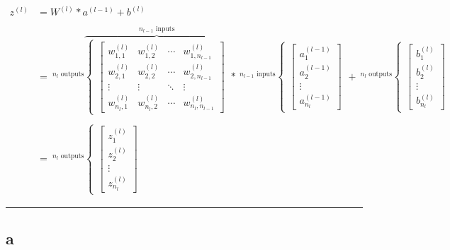 \documentclass[
]{book}
\begin{document}
\[
\begin{aligned}
z^{(l)} &= W^{(l)} * a^{(l - 1)} + b^{(l)} \\ \\
&= \ ^{n_l\text{ outputs}}
\overbrace{
  \begin{cases}
    \begin{bmatrix}
    w^{(l)}_{1, 1} & w^{(l)}_{1, 2} & \cdots & w^{(l)}_{1, n_{l-1}} \\
    w^{(l)}_{2, 1} & w^{(l)}_{2, 2} & \cdots & w^{(l)}_{2, n_{l-1}} \\
    \vdots & \vdots & \ddots & \vdots \\
    w^{(l)}_{n_l, 1} & w^{(l)}_{n_l, 2} & \cdots & w^{(l)}_{n_l, n_{l-1}}
    \end{bmatrix}
  \end{cases} 
}^{n_{l - 1} \text{ inputs}} * \ ^{n_{l - 1} \text{ inputs}}
  \begin{cases}
    \begin{bmatrix}
      a^{(l-1)}_{1} \\
      a^{(l-1)}_{2} \\
      \vdots \\
      a^{(l-1)}_{n_l}
    \end{bmatrix}
  \end{cases} + \ ^{n_l\text{ outputs}}
  \begin{cases}
    \begin{bmatrix}
    b^{(l)}_{1} \\
    b^{(l)}_{2} \\
    \vdots \\
    b^{(l)}_{n_l}
    \end{bmatrix}
  \end{cases} \\ \\
&= \ ^{n_l\text{ outputs}}
  \begin{cases}
    \begin{bmatrix}
      z^{(l)}_{1} \\
      z^{(l)}_{2} \\
      \vdots \\
      z^{(l)}_{n_l}
    \end{bmatrix}
  \end{cases}
\end{aligned}
\]

\begin{center}\rule{0.5\linewidth}{0.5pt}\end{center}

\hypertarget{a}{%
\subsection{a}\label{a}}
\end{document}

